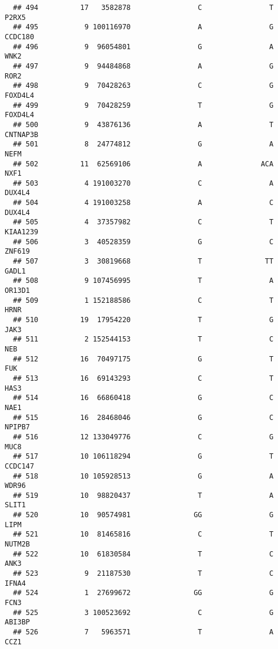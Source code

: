 \documentclass[12pt,twoside]{reedthesis}
\theoremstyle{definition}
\theoremstyle{definition}
\theoremstyle{remark}
\begin{document}
\begin{verbatim}
  ## 494          17   3582878                C                T          P2RX5
  ## 495           9 100116970                A                G        CCDC180
  ## 496           9  96054801                G                A           WNK2
  ## 497           9  94484868                A                G           ROR2
  ## 498           9  70428263                C                G        FOXD4L4
  ## 499           9  70428259                T                G        FOXD4L4
  ## 500           9  43876136                A                T       CNTNAP3B
  ## 501           8  24774812                G                A           NEFM
  ## 502          11  62569106                A              ACA           NXF1
  ## 503           4 191003270                C                A         DUX4L4
  ## 504           4 191003258                A                C         DUX4L4
  ## 505           4  37357982                C                T       KIAA1239
  ## 506           3  40528359                G                C         ZNF619
  ## 507           3  30819668                T               TT          GADL1
  ## 508           9 107456995                T                A         OR13D1
  ## 509           1 152188586                C                T           HRNR
  ## 510          19  17954220                T                G           JAK3
  ## 511           2 152544153                T                C            NEB
  ## 512          16  70497175                G                T            FUK
  ## 513          16  69143293                C                T           HAS3
  ## 514          16  66860418                G                C           NAE1
  ## 515          16  28468046                G                C         NPIPB7
  ## 516          12 133049776                C                G           MUC8
  ## 517          10 106118294                G                T        CCDC147
  ## 518          10 105928513                G                A          WDR96
  ## 519          10  98820437                T                A          SLIT1
  ## 520          10  90574981               GG                G           LIPM
  ## 521          10  81465816                C                T         NUTM2B
  ## 522          10  61830584                T                C           ANK3
  ## 523           9  21187530                T                C          IFNA4
  ## 524           1  27699672               GG                G           FCN3
  ## 525           3 100523692                C                G         ABI3BP
  ## 526           7   5963571                T                A           CCZ1

\end{verbatim}
\end{document}
